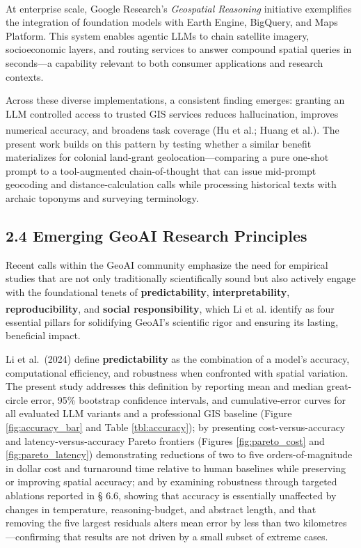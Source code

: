 \documentclass[
  10pt]{article}
\begin{document}
At enterprise scale, Google Research's \emph{Geospatial Reasoning}
initiative\textsuperscript{}
exemplifies the integration of foundation models with Earth Engine,
BigQuery, and Maps Platform. This system enables agentic LLMs to chain
satellite imagery, socioeconomic layers, and routing services to answer
compound spatial queries in seconds---a capability relevant to both
consumer applications and research contexts.

Across these diverse implementations, a consistent finding emerges:
granting an LLM controlled access to trusted GIS services reduces
hallucination, improves numerical accuracy, and broadens task coverage
(Hu et al.\textsuperscript{}; Huang
et al.\textsuperscript{}). The
present work builds on this pattern by testing whether a similar benefit
materializes for colonial land-grant geolocation---comparing a pure
one-shot prompt to a tool-augmented chain-of-thought that can issue
mid-prompt geocoding and distance-calculation calls while processing
historical texts with archaic toponyms and surveying terminology.

\subsection{2.4 Emerging GeoAI Research
Principles}\label{emerging-geoai-research-principles}

Recent calls within the GeoAI community emphasize the need for empirical
studies that are not only traditionally scientifically sound but also
actively engage with the foundational tenets of \textbf{predictability},
\textbf{interpretability}, \textbf{reproducibility}, and \textbf{social
responsibility}, which Li et
al.\textsuperscript{} identify as four
essential pillars for solidifying GeoAI's scientific rigor and ensuring
its lasting, beneficial impact.

Li et al.~(2024) define \textbf{predictability} as the combination of a
model's accuracy, computational efficiency, and robustness when
confronted with spatial variation. The present study addresses this
definition by reporting mean and median great-circle error, 95\%
bootstrap confidence intervals, and cumulative-error curves for all
evaluated LLM variants and a professional GIS baseline (Figure
\ref{fig:accuracy_bar} and Table \ref{tbl:accuracy}); by presenting
cost-versus-accuracy and latency-versus-accuracy Pareto frontiers
(Figures \ref{fig:pareto_cost} and \ref{fig:pareto_latency})
demonstrating reductions of two to five orders-of-magnitude in dollar
cost and turnaround time relative to human baselines while preserving or
improving spatial accuracy; and by examining robustness through targeted
ablations reported in § 6.6, showing that accuracy is essentially
unaffected by changes in temperature, reasoning-budget, and abstract
length, and that removing the five largest residuals alters mean error
by less than two kilometres---confirming that results are not driven by
a small subset of extreme cases.
\end{document}
